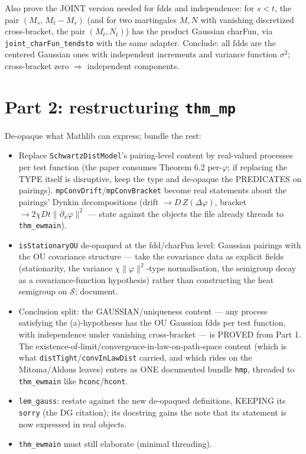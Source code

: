 \documentclass[11pt]{article}
\theoremstyle{plain}
\theoremstyle{remark}
\begin{document}
Also prove the JOINT version needed for fdds and independence: for
$s<t$, the pair $(M_s,\,M_t-M_s)$ (and for two martingales $M,N$ with
vanishing discretized cross-bracket, the pair $(M_t,N_t)$) has the product
Gaussian charFun, via \texttt{joint\_charFun\_tendsto} with the same adapter.
Conclude: all fdds are the centered Gaussian ones with independent increments
and variance function $\sigma^2$; cross-bracket zero $\Rightarrow$
independent components.

\section*{Part 2: restructuring \texttt{thm\_mp}}

De-opaque what Mathlib can express; bundle the rest:
\begin{itemize}
\item[(a)] Replace \texttt{SchwartzDistModel}'s pairing-level content by
real-valued processes per test function (the paper consumes Theorem 6.2
per-$\varphi$; if replacing the TYPE itself is disruptive, keep the type and
de-opaque the PREDICATES on pairings). \texttt{mpConvDrift}/\texttt{mpConvBracket}
become real statements about the pairings' Dynkin decompositions
(drift $\to D\,Z(\Delta\varphi)$, bracket $\to2\chi Dt\|\partial_x\varphi\|^2$
--- state against the objects the file already threads to
\texttt{thm\_ewmain}).
\item[(b)] \texttt{isStationaryOU} de-opaqued at the fdd/charFun level:
Gaussian pairings with the OU covariance structure --- take the covariance
data as explicit fields (stationarity, the variance $\chi\|\varphi\|^2$-type
normalisation, the semigroup decay as a covariance-function hypothesis)
rather than constructing the heat semigroup on $\mathcal S$; document.
\item[(c)] Conclusion split: the GAUSSIAN/uniqueness content --- any process
satisfying the (a)-hypotheses has the OU Gaussian fdds per test function,
with independence under vanishing cross-bracket --- is PROVED from Part 1.
The existence-of-limit/convergence-in-law-on-path-space content (which is
what \texttt{distTight}/\texttt{convInLawDist} carried, and which rides on
the Mitoma/Aldous leaves) enters as ONE documented bundle \texttt{hmp},
threaded to \texttt{thm\_ewmain} like \texttt{hconc}/\texttt{hcont}.
\item[(d)] \texttt{lem\_gauss}: restate against the new de-opaqued
definitions, KEEPING its \texttt{sorry} (the DG citation); its docstring
gains the note that its statement is now expressed in real objects.
\item[(e)] \texttt{thm\_ewmain} must still elaborate (minimal threading).
\end{itemize}
\end{document}
